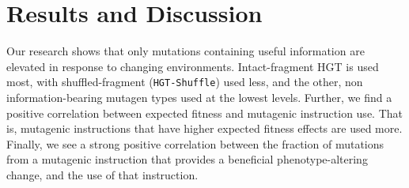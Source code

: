 \documentclass[PhD]{msu-thesis}
\begin{document}
\section{Results and Discussion}
Our research shows that only mutations containing useful information are elevated in response to changing environments. Intact-fragment HGT is used most, with shuffled-fragment (\texttt{HGT-Shuffle}) used less, and the other, non information-bearing mutagen types used at the lowest levels.  Further, we find a positive correlation between expected fitness and mutagenic instruction use. That is, mutagenic instructions that have higher expected fitness effects are used more. Finally, we see a strong positive correlation between the fraction of mutations from a mutagenic instruction that provides a beneficial phenotype-altering change, and the use of that instruction.
\end{document}
